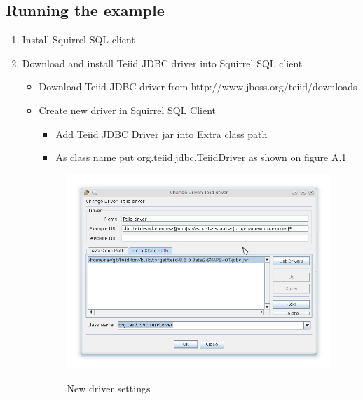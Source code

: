 \documentclass[oneside,12pt,final]{fithesis2}
\begin{document}
\begin{enumerate}
\subsection*{Running the example}
\begin{enumerate}
 \item Install Squirrel SQL client
 \item Download and install Teiid JDBC driver into Squirrel SQL client
 \begin{itemize}
  \item Download Teiid JDBC driver from http://www.jboss.org/teiid/downloads
  \item Create new driver in Squirrel SQL Client
  \begin{itemize}
   \item Add Teiid JDBC Driver jar into Extra class path
   \item As class name put org.teiid.jdbc.TeiidDriver as shown on figure A.1
  \end{itemize}
  \begin{figure}[h]
 \centering
 \includegraphics[scale=0.7]{driver}
 \label{driver}
 \caption{New driver settings}
\end{figure}
  

\end{itemize}
\end{enumerate}
\end{enumerate}
\end{document}
